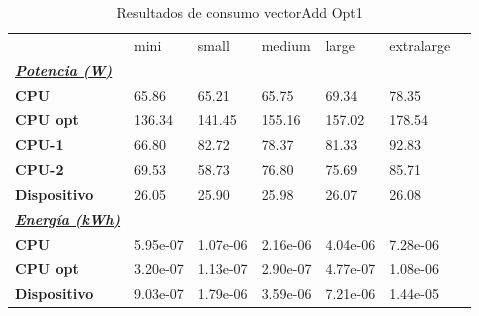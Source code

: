\begin{table}[H]
    \centering
    \begin{tabular}{lllllll}
    \rowcolor[HTML]{DAE8FC} \ & mini & small & medium & 	large & 	extralarge \\
    \cellcolor[HTML]{DAE8FC} \textbf{\textbf{{\emph{{\underline{{Potencia (W)}}}}}}} &  &  &  & 	 & 	 \\
    \rowcolor[HTML]{EFEFEF} \cellcolor[HTML]{DAE8FC} \textbf{CPU} & 65.86 & 65.21 & 65.75 & 	69.34 & 	78.35 \\
    \cellcolor[HTML]{DAE8FC} \textbf{CPU opt} & 136.34 & 141.45 & 155.16 & 	157.02 & 	178.54 \\
    \rowcolor[HTML]{EFEFEF} \cellcolor[HTML]{DAE8FC} \textbf{\quad CPU-1} & 66.80 & 82.72 & 78.37 & 	81.33 & 	92.83 \\
    \cellcolor[HTML]{DAE8FC} \textbf{\quad CPU-2} & 69.53 & 58.73 & 76.80 & 	75.69 & 	85.71 \\
    \rowcolor[HTML]{EFEFEF} \cellcolor[HTML]{DAE8FC} \textbf{Dispositivo} & 26.05 & 25.90 & 25.98 & 	26.07 & 	26.08 \\
    \cellcolor[HTML]{DAE8FC} \textbf{\textbf{{\emph{{\underline{{Energía (kWh)}}}}}}} &  &  &  & 	 & 	 \\
    \rowcolor[HTML]{EFEFEF} \cellcolor[HTML]{DAE8FC} \textbf{CPU} & 5.95e-07 & 1.07e-06 & 2.16e-06 & 	4.04e-06 & 	7.28e-06 \\
    \cellcolor[HTML]{DAE8FC} \textbf{CPU opt} & 3.20e-07 & 1.13e-07 & 2.90e-07 & 	4.77e-07 & 	1.08e-06 \\
    \rowcolor[HTML]{EFEFEF} \cellcolor[HTML]{DAE8FC} \textbf{Dispositivo} & 9.03e-07 & 1.79e-06 & 3.59e-06 & 	7.21e-06 & 	1.44e-05 \\
    \end{tabular}
    \caption[Resultados de consumo vectorAdd Opt1]{{Resultados de consumo vectorAdd Opt1}}
    \label{table_test_vectorAdd_Opt1_hw_powerResults}
\end{table}